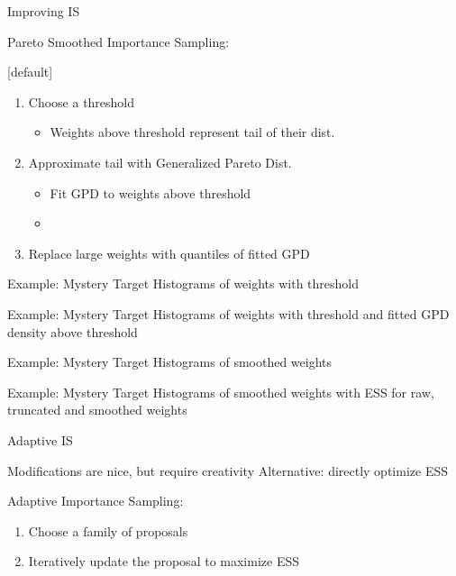 \documentclass[14pt]{beamer}
\begin{document}
\begin{frame}{Improving IS}
    \begin{outline}
    \1 Pareto Smoothed Importance Sampling:
        \2 \citep{Veh22} \newline
    \end{outline}

    [default]
    \begin{enumerate}
    \item Choose a threshold
        \begin{itemize}
            \item Weights above threshold represent tail of their dist.
        \end{itemize}
    \item Approximate tail with Generalized Pareto Dist.
    \begin{itemize}
        \item Fit GPD to weights above threshold
        \item \citep{Zha09}
    \end{itemize}
    \item Replace large weights with quantiles of fitted GPD
    \end{enumerate}
\end{frame}

\begin{frame}{Example: Mystery Target}
    Histograms of weights with threshold
\end{frame}

\begin{frame}{Example: Mystery Target}
    Histograms of weights with threshold and fitted GPD density above threshold
\end{frame}

\begin{frame}{Example: Mystery Target}
    Histograms of smoothed weights
\end{frame}

\begin{frame}{Example: Mystery Target}
    Histograms of smoothed weights with ESS for raw, truncated and smoothed weights
\end{frame}

\begin{frame}{Adaptive IS}
    \begin{outline}
        \1 Modifications are nice, but require creativity
        \1 Alternative: directly optimize ESS \newline

        \1 Adaptive Importance Sampling: 
            \2 \citep{Aky21} \newline
    \end{outline}

    \begin{enumerate}
        [default]
        \item Choose a family of proposals
        \item Iteratively update the proposal to maximize ESS
    \end{enumerate}
\end{frame}
\end{document}
